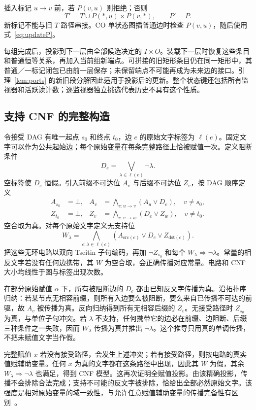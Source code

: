 插入标记 $u\to v$ 前，若 $P(v,u)$ 则拒绝；否则
\[
 T'=T\cup P(*,u)\times P(v,*),\qquad P'=P.
\]
新标记不能与旧 $T$ 路径串接。CO 单状态图插普通边时检查 $P(v,u)$，随后使用式~\eqref{eq:updateP}。

每组完成后，投影到下一层由全部候选决定的 $I\times O$。装载下一层时恢复这些条目和普通恒等关系，再加入当前组新端点。可拼接的旧矩形条目仍在同一矩形中，其普通／一标记闭包已由前一层保存；未保留端点不可能再成为未来边的接口。引理~\ref{lem:ports} 的新旧段分解因此适用于投影后的更新。整个状态键还包括所有监视器和活跃读计数；逐监视器独立挑选代表历史不具有这个性质。

\subsection{支持 CNF 的完整构造}\label{app:supportcnf}
令接受 DAG 有唯一起点 $s_0$ 和终点 $t_0$，边 $e$ 的原始文字标签为 $\ell(e)$。固定文字可以作为公共起始边；每个原始变量在每条完整路径上恰被赋值一次。定义阻断条件
\[
 D_e=\bigvee_{\lambda\in\ell(e)}\neg\lambda.
\]
空标签使 $D_e$ 恒假。引入前缀不可达位 $A_v$ 与后缀不可达位 $Z_v$，按 DAG 顺序定义
\begin{align*}
 A_{s_0}&=\bot,& A_v&=\bigwedge_{e:u\to v}(A_u\lor D_e),\quad v\ne s_0,\\
 Z_{t_0}&=\bot,& Z_v&=\bigwedge_{e:v\to w}(D_e\lor Z_w),\quad v\ne t_0.
\end{align*}
空合取为真。对每个原始文字定义无支持位
\[
 W_\lambda=\bigwedge_{e:\lambda\in\ell(e)}(A_{\mathrm{src}(e)}\lor D_e\lor Z_{\mathrm{dst}(e)}).
\]
把这些无环电路以双向 Tseitin 子句编码，再加 $\neg Z_{s_0}$ 和每个 $W_\lambda\Rightarrow\neg\lambda$。常量的相反文字若没有任何边携带，其 $W$ 为空合取，会正确传播对应常量。电路和 CNF 大小均线性于图与标签出现次数。

在部分原始赋值 $\alpha$ 下，所有被阻断边的 $D_e$ 都由已知反文字传播为真。沿拓扑序归纳：若某节点无相容前缀，则所有入边要么被阻断，要么来自已传播不可达的前驱，故 $A_v$ 被传播为真。反向归纳得到所有无相容后缀的 $Z_v$。无接受路径时 $Z_{s_0}$ 为真，与单位子句冲突。若 $\lambda$ 不支持，任何携带它的边必在前缀、边阻断、后缀三种条件之一失败，因而 $W_\lambda$ 传播为真并推出 $\neg\lambda$。这个推导只用真的单调传播，不把未赋值文字当作假。

完整赋值 $x$ 若没有接受路径，会发生上述冲突；若有接受路径，则按电路的真实值赋辅助变量。任何 $x$ 为真的文字都在这条路径中出现，因此其 $W$ 为假，其余 $W_\lambda\Rightarrow\neg\lambda$ 也满足，得到 CNF 模型。这再次证明全赋值投影。由该精确投影，传播不会排除合法完成；支持不可能的反文字被排除，恰给出全部必然原始文字。该强度是相对原始变量的域一致性，与允许任意赋值辅助变量的传播完备性有区别~\cite{kucera2021}。

